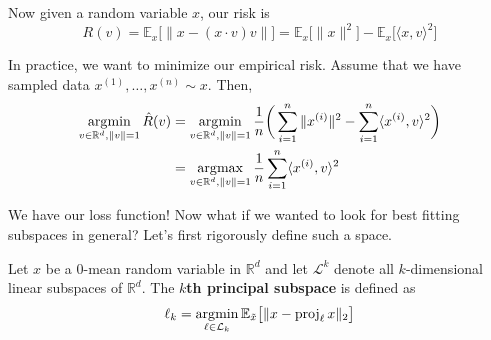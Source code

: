   Now given a random variable $x$, our risk is
  \begin{equation}
    R(v) = \mathbb{E}_x \big[ \| x - (x \cdot v) v \| \big] = \mathbb{E}_x \big[ \|x\|^2 \big] - \mathbb{E}_x \big[ \langle x, v \rangle^2 \big]
  \end{equation} 

  In practice, we want to minimize our empirical risk. Assume that we have sampled data $x^{(1)}, \ldots, x^{(n)} \sim x$. Then, 
  \begin{align} 
    \operatorname*{\arg\!\min}_{v \in \mathbb{R}^{d}, \|v\| = 1} \hat{R}(v) 
    & =  \operatorname*{\arg\!\min}_{v \in \mathbb{R}^{d}, \|v\| = 1} \frac{1}{n} \bigg( \sum_{i = 1}^n \|x^{(i)} \|^2 - \sum_{i=1}^n \langle x^{(i)}, v \rangle^2 \bigg) \\ 
    & = \operatorname*{\arg\!\max}_{v \in \mathbb{R}^{d}, \|v\| = 1} \frac{1}{n} \sum_{i=1}^n \langle x^{(i)}, v \rangle^2 
  \end{align} 

  We have our loss function! Now what if we wanted to look for best fitting subspaces in general? Let's first rigorously define such a space. 

  \begin{definition} 
    Let $x$ be a $0$-mean random variable in $\mathbb{R}^d$ and let $\mathcal{L}^k$ denote all $k$-dimensional linear subspaces of $\mathbb{R}^d$. The \textbf{$k$th principal subspace} is defined as 
    \begin{equation}
      \ell_k = \operatorname*{\arg\!\min}_{\ell \in \mathcal{L}_k} \mathbb{E}_{\Tilde{x}} \big[ \| x - \operatorname{proj}_\ell x\|_2 \big]
    \end{equation}
  \end{definition}

